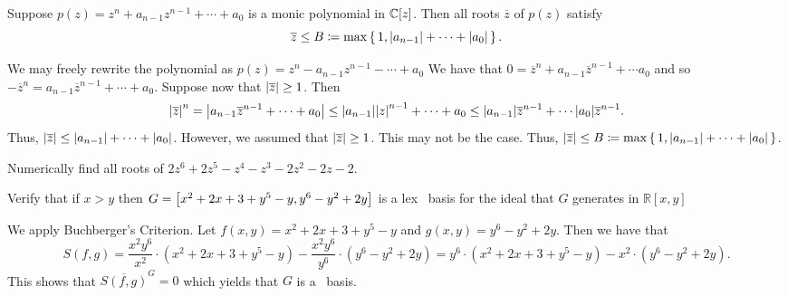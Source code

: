 \documentclass[letterpaper, 11pt, oneside]{book}
\begin{document}
\begin{exercise}\label{ex:UAG_2.1.2}

\end{exercise}

\begin{exercise}\label{ex:UAG_2.1.3}
  Suppose $p(z) = z^{n} + a_{n - 1}z^{n - 1} + \cdots + a_{0}$ is a monic polynomial in $\mathbb{C}[z]$.
  Then all roots $\overline{z}$ of $p(z)$ satisfy
  \[
    \overline{z} \leq B \coloneqq \max\set{1, \abs{a_{n - 1}} + \cdots + \abs{a_{0}}}.
  \]
\end{exercise}
\begin{pf}
  We may freely rewrite the polynomial as $p(z) = z^{n} - a_{n - 1}z^{n - 1} - \cdots + a_{0}$
  We have that $0 = \overline{z}^{n} + a_{n - 1}\overline{z}^{n - 1} + \cdots a_{0}$ and so $-\overline{z}^{n} = a_{n - 1}\overline{z}^{n - 1} + \cdots + a_{0}$.
  Suppose now that $\abs{\overline{z}} \geq 1$.
  Then
  \[
    \abs{\overline{z}}^{n} = \abs{a_{n - 1}\overline{z}^{n - 1} + \cdots + a_{0}} \leq \abs{a_{n - 1}}\abs{z}^{n - 1} + \cdots + a_{0} \leq \abs{a_{n - 1}}\overline{z}^{n - 1} + \cdots \abs{a_{0}}\overline{z}^{n - 1}.
  \]
  Thus, $\abs{\overline{z}} \leq \abs{a_{n - 1}} + \cdots + \abs{a_{0}}$.
  However, we assumed that $\abs{\overline{z}} \geq 1$.
  This may not be the case.
  Thus, $\abs{\overline{z}} \leq B \coloneqq \max\set{1, \abs{a_{n - 1}} + \cdots + \abs{a_{0}}}$.
\end{pf}

\begin{exercise}\label{ex:UAG_2.1.4}
  Numerically find all roots of $2z^{6} + 2z^{5} - z^{4} - z^{3} - 2z^{2} - 2z - 2$.
\end{exercise}

\clearpage

\begin{exercise}\label{ex:UAG_2.1.5}
  Verify that if $x > y$ then $G = \bqty{x^{2} + 2x + 3 + y^{5} - y, y^{6} - y^{2} + 2y}$ is a lex \Grobner\ basis for the ideal that $G$ generates in $\mathbb{R}[x, y]$
\end{exercise}
\begin{pf}
  We apply Buchberger's Criterion.
  Let $f(x, y) = x^{2} + 2x + 3 + y^{5} - y$ and $g(x, y) = y^{6} - y^{2} + 2y$.
  Then we have that
  \[
    S(f, g) = \frac{x^{2}y^{6}}{x^{2}} \cdot (x^{2} + 2x + 3 + y^{5} - y) - \frac{x^{2}y^{6}}{y^{6}} \cdot (y^{6} - y^{2} + 2y) = y^{6} \cdot (x^{2} + 2x + 3 + y^{5} - y) - x^{2} \cdot (y^{6} - y^{2} + 2y).
  \]
  This shows that $\overline{S(f, g)}^{G} = 0$ which yields that $G$ is a \Grobner\ basis.
\end{pf}
\end{document}
